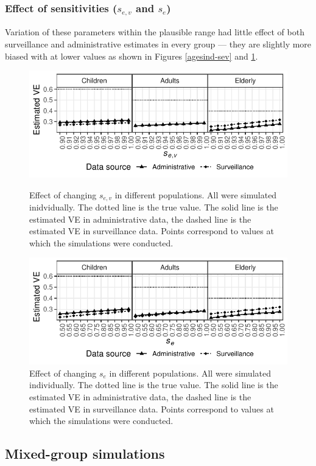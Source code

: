 \documentclass[11pt]{article}
\begin{document}
\pagebreak

\subsubsection{Effect of sensitivities ($s_{e,v}$ and $s_e$)}

Variation of these parameters within the plausible range had little effect of both surveillance and administrative estimates in every group --- they are slightly more biased with at lower values as shown in Figures \ref{agesind-sev} and \ref{agesind-spv}.

\begin{figure}[h]
	\centering
		\includegraphics[width=0.75\linewidth]{../fig-agesind/agesind-sens_vac.pdf}
		\caption{
Effect of changing $s_{e,v}$ in different populations. All were simulated inidvidually. The dotted line is the true value. The solid line is the estimated VE in administrative data, the dashed line is the estimated VE in surveillance data. Points correspond to values at which the simulations were conducted. \label{agesind-sev}
		}
		\includegraphics[width=0.75\linewidth]{../fig-agesind/agesind-sens_flu.pdf}
		\caption{
Effect of changing $s_e$ in different populations. All were simulated individually. The dotted line is the true value. The solid line is the estimated VE in administrative data, the dashed line is the estimated VE in surveillance data. Points correspond to values at which the simulations were conducted. \label{agesind-spv}
		}
\end{figure}

\pagebreak
%
\subsection{Mixed-group simulations}
\end{document}

